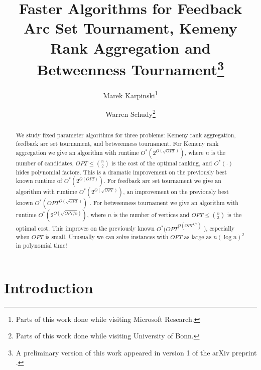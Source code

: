 \documentclass[envcountsame,oribibl]{llncs}
\begin{document}
\title{Faster Algorithms for Feedback Arc Set Tournament, Kemeny Rank Aggregation and Betweenness Tournament\thanks{A preliminary version of this work appeared in version 1 of the arXiv preprint \cite{Karpinski09betweenness}.}}
  \author{Marek Karpinski\thanks{Parts of this work done while visiting Microsoft Research.} \and Warren Schudy\thanks{Parts of this work done while visiting University of Bonn.}}
 

\maketitle              

\begin{abstract}
We study fixed parameter algorithms for three problems: Kemeny rank aggregation, feedback arc set tournament, and betweenness tournament. For Kemeny rank aggregation we give an algorithm with runtime $O^*(2^{O(\sqrt{OPT})})$, where $n$ is the number of candidates, $OPT \le \binom{n}{2}$ is the cost of the optimal ranking, and $O^*(\cdot)$ hides polynomial factors. This is a dramatic improvement on the previously best known runtime of $O^*(2^{O(OPT)})$. For feedback arc set tournament we give an algorithm with runtime $O^*(2^{O(\sqrt{OPT})})$, an improvement on the previously best known $O^*(OPT^{O(\sqrt{OPT})})$ \cite{Alon09}. For betweenness tournament we give an algorithm with runtime $O^*(2^{O(\sqrt{OPT/n})})$, where $n$ is the number of vertices and $OPT \le \binom{n}{3}$ is the optimal cost. This improves on the previously known $O^*(OPT^{O(OPT^{1/3})}$ \cite{Saurabh09}), especially when $OPT$ is small. Unusually we can solve instances with $OPT$ as large as $n (\log n)^2$ in polynomial time!

\end{abstract}

\section{Introduction}
\end{document}
